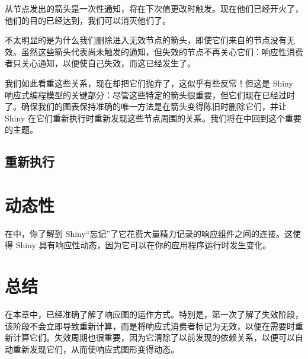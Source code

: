 从节点发出的箭头是一次性通知，将在下次值更改时触发。现在他们已经开火了，他们的目的已经达到，我们可以消灭他们了。

不太明显的是为什么我们删除进入无效节点的箭头，即使它们来自的节点没有无效。虽然这些箭头代表尚未触发的通知，但失效的节点不再关心它们：响应性消费者只关心通知，以便使自己失效，而这已经发生了。

我们如此看重这些关系，现在却把它们抛弃了，这似乎有些反常！但这是 Shiny 响应式编程模型的关键部分：尽管这些特定的箭头很重要，但它们现在已经过时了。确保我们的图表保持准确的唯一方法是在箭头变得陈旧时删除它们，并让 Shiny 在它们重新执行时重新发现这些节点周围的关系。我们将在中回到这个重要的主题。
\subsection{重新执行}
\section{动态性\label{14.5}}
在中，你了解到 Shiny“忘记”了它花费大量精力记录的响应组件之间的连接。这使得 Shiny 具有响应性动态，因为它可以在你的应用程序运行时发生变化。
\section{总结}
在本章中，已经准确了解了响应图的运作方式。特别是，第一次了解了失效阶段，该阶段不会立即导致重新计算，而是将响应式消费者标记为无效，以便在需要时重新计算它们。失效周期也很重要，因为它清除了以前发现的依赖关系，以便可以自动重新发现它们，从而使响应式图形变得动态。